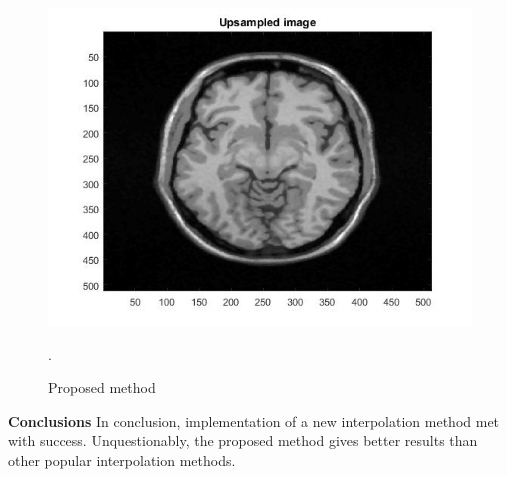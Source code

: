 \begin{figure}[H]
\centering{}\includegraphics[scale=0.4]{figures/Module_10/Module_10_thebest}\caption{Proposed method}. 
\label{fig: Module10_thebest}
\end{figure}

\textbf{Conclusions}
\newline In conclusion, implementation of a new interpolation method met with success. Unquestionably, the proposed method gives better results than other popular interpolation methods.
